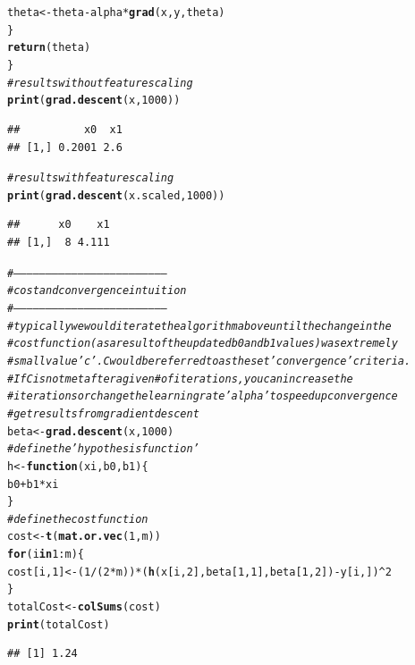 \documentclass[12pt, a4paper, oneside]{article}\usepackage[]{graphicx}\usepackage[]{color}
\makeatletter
\newcommand{\hlnum}[1]{\textcolor[rgb]{0.686,0.059,0.569}{#1}}%
\newcommand{\hlcom}[1]{\textcolor[rgb]{0.678,0.584,0.686}{\textit{#1}}}%
\newcommand{\hlopt}[1]{\textcolor[rgb]{0,0,0}{#1}}%
\newcommand{\hlstd}[1]{\textcolor[rgb]{0.345,0.345,0.345}{#1}}%
\newcommand{\hlkwa}[1]{\textcolor[rgb]{0.161,0.373,0.58}{\textbf{#1}}}%
\newcommand{\hlkwb}[1]{\textcolor[rgb]{0.69,0.353,0.396}{#1}}%
\newcommand{\hlkwc}[1]{\textcolor[rgb]{0.333,0.667,0.333}{#1}}%
\newcommand{\hlkwd}[1]{\textcolor[rgb]{0.737,0.353,0.396}{\textbf{#1}}}%
\newenvironment{kframe}{%
 \def\at@end@of@kframe{}%
 \ifinner\ifhmode%
  \def\at@end@of@kframe{\end{minipage}}%
  \begin{minipage}{\columnwidth}%
 \fi\fi%
 \def\FrameCommand##1{\hskip\@totalleftmargin \hskip-\fboxsep
 \colorbox{shadecolor}{##1}\hskip-\fboxsep
     \hskip-\linewidth \hskip-\@totalleftmargin \hskip\columnwidth}%
 \MakeFramed {\advance\hsize-\width
   \@totalleftmargin\z@ \linewidth\hsize
   \@setminipage}}%
 {\par\unskip\endMakeFramed%
 \at@end@of@kframe}
\newenvironment{knitrout}{}{} %
\makeatother
\begin{document}
\begin{knitrout}
\begin{kframe}
\begin{alltt}
        \hlstd{theta} \hlkwb{<-} \hlstd{theta} \hlopt{-} \hlstd{alpha} \hlopt{*} \hlkwd{grad}\hlstd{(x, y, theta)}
    \hlstd{\}}
    \hlkwd{return}\hlstd{(theta)}
\hlstd{\}}
\hlcom{# results without feature scaling}
\hlkwd{print}\hlstd{(}\hlkwd{grad.descent}\hlstd{(x,} \hlnum{1000}\hlstd{))}
\end{alltt}
\begin{verbatim}
##          x0  x1
## [1,] 0.2001 2.6
\end{verbatim}
\begin{alltt}
\hlcom{# results with feature scaling}
\hlkwd{print}\hlstd{(}\hlkwd{grad.descent}\hlstd{(x.scaled,} \hlnum{1000}\hlstd{))}
\end{alltt}
\begin{verbatim}
##      x0    x1
## [1,]  8 4.111
\end{verbatim}
\begin{alltt}
\hlcom{# -----------------------------------------------------------------------}
\hlcom{# cost and convergence intuition}
\hlcom{# -----------------------------------------------------------------------}
\hlcom{# typically we would iterate the algorithm above until the change in the}
\hlcom{# cost function (as a result of the updated b0 and b1 values) was extremely}
\hlcom{# small value 'c'. C would be referred to as the set 'convergence' criteria.}
\hlcom{# If C is not met after a given # of iterations, you can increase the}
\hlcom{# iterations or change the learning rate 'alpha' to speed up convergence}
\hlcom{# get results from gradient descent}
\hlstd{beta} \hlkwb{<-} \hlkwd{grad.descent}\hlstd{(x,} \hlnum{1000}\hlstd{)}
\hlcom{# define the 'hypothesis function'}
\hlstd{h} \hlkwb{<-} \hlkwa{function}\hlstd{(}\hlkwc{xi}\hlstd{,} \hlkwc{b0}\hlstd{,} \hlkwc{b1}\hlstd{) \{}
    \hlstd{b0} \hlopt{+} \hlstd{b1} \hlopt{*} \hlstd{xi}
\hlstd{\}}
\hlcom{# define the cost function}
\hlstd{cost} \hlkwb{<-} \hlkwd{t}\hlstd{(}\hlkwd{mat.or.vec}\hlstd{(}\hlnum{1}\hlstd{, m))}
\hlkwa{for} \hlstd{(i} \hlkwa{in} \hlnum{1}\hlopt{:}\hlstd{m) \{}
    \hlstd{cost[i,} \hlnum{1}\hlstd{]} \hlkwb{<-} \hlstd{(}\hlnum{1}\hlopt{/}\hlstd{(}\hlnum{2} \hlopt{*} \hlstd{m))} \hlopt{*} \hlstd{(}\hlkwd{h}\hlstd{(x[i,} \hlnum{2}\hlstd{], beta[}\hlnum{1}\hlstd{,} \hlnum{1}\hlstd{], beta[}\hlnum{1}\hlstd{,} \hlnum{2}\hlstd{])} \hlopt{-} \hlstd{y[i, ])}\hlopt{^}\hlnum{2}
\hlstd{\}}
\hlstd{totalCost} \hlkwb{<-} \hlkwd{colSums}\hlstd{(cost)}
\hlkwd{print}\hlstd{(totalCost)}
\end{alltt}
\begin{verbatim}
## [1] 1.24

\end{verbatim}
\end{kframe}
\end{knitrout}
\end{document}
